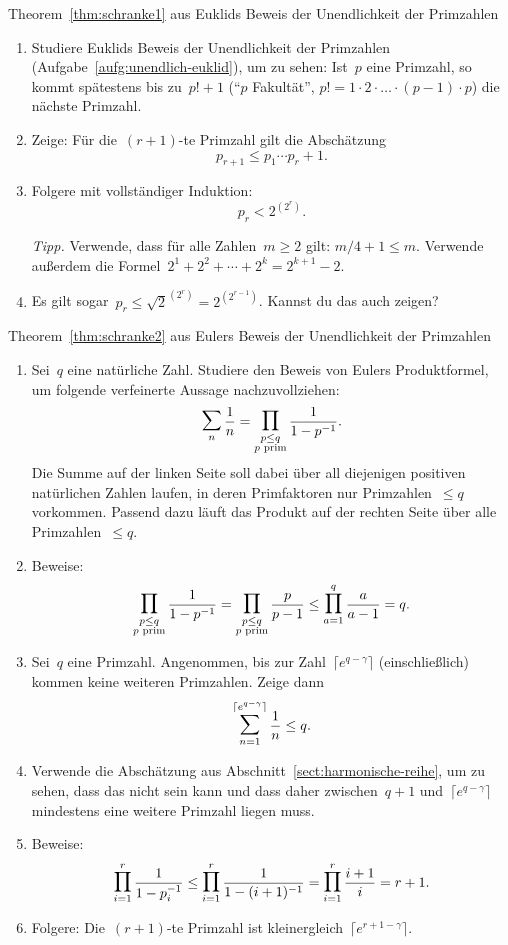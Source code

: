\documentclass[twoside]{../zirkelblatt1415}
\theoremstyle{definition}
\theoremstyle{plain}
\theoremstyle{remark}
\newcommand{\prim}[1]{\text{\textnormal{$#1$ prim}}}
\newcommand{\bigsum}{\mathop{\mathlarger{\mathlarger{\sum}}}}
\newcommand{\bigprod}{\mathop{\mathlarger{\mathlarger{\prod}}}}
\begin{document}
\begin{aufgabe}{Theorem~\ref{thm:schranke1} aus Euklids Beweis der
Unendlichkeit der Primzahlen}
\begin{enumerate}
\item Studiere Euklids Beweis der Unendlichkeit der Primzahlen
(Aufgabe~\ref{aufg:unendlich-euklid}), um zu sehen: Ist~$p$ eine Primzahl, so
kommt spätestens bis zu~$p! + 1$ ("`$p$ Fakultät"', $p! = 1 \cdot 2 \cdot
\ldots \cdot (p-1) \cdot p$) die nächste Primzahl.
\item Zeige: Für die~$(r+1)$-te Primzahl gilt die Abschätzung
\[ p_{r+1} \leq p_1 \cdots p_r + 1. \]
\item Folgere mit vollständiger Induktion:
\[ p_r < 2^{(2^r)}. \]

\emph{Tipp.} Verwende, dass für alle Zahlen~$m \geq 2$ gilt: $m/4 +
1 \leq m$. Verwende außerdem die Formel~$2^1 + 2^2 + \cdots + 2^k = 2^{k+1} -
2$.
\item Es gilt sogar~$p_r \leq \sqrt{2}^{(2^r)} = 2^{(2^{r-1})}$. Kannst du das
auch zeigen?
\end{enumerate}\fixlistspacing
\end{aufgabe}

\begin{aufgabe}{Theorem~\ref{thm:schranke2} aus Eulers Beweis der
Unendlichkeit der Primzahlen}
\begin{enumerate}
\item Sei~$q$ eine natürliche Zahl. Studiere den Beweis von Eulers
Produktformel, um folgende verfeinerte Aussage nachzuvollziehen:
\[ \bigsum_n \frac{1}{n} = \bigprod_{\substack{p \leq q \\ \prim{p}}} \frac{1}{1 -
p^{-1}}. \]
Die Summe auf der linken Seite soll dabei über all diejenigen positiven
natürlichen Zahlen laufen, in deren Primfaktoren nur Primzahlen~$\leq q$
vorkommen. Passend dazu läuft das Produkt auf der rechten Seite über alle
Primzahlen~$\leq q$.
\item Beweise:
\[
  \bigprod_{\substack{p \leq q \\ \prim{p}}} \frac{1}{1 - p^{-1}} =
  \bigprod_{\substack{p \leq q \\ \prim{p}}} \frac{p}{p - 1} \leq
  \bigprod_{a=1}^q \frac{a}{a - 1} = q. \]
\item Sei~$q$ eine Primzahl. Angenommen, bis zur Zahl~$\lceil e^{q-\gamma}
\rceil$ (einschließlich) kommen keine weiteren Primzahlen. Zeige dann
\[ \bigsum_{n=1}^{\lceil e^{q-\gamma} \rceil} \frac{1}{n} \leq q. \]
\item Verwende die Abschätzung aus Abschnitt~\ref{sect:harmonische-reihe}, um
zu sehen, dass das nicht sein kann und dass daher zwischen~$q+1$ und~$\lceil
e^{q-\gamma} \rceil$ mindestens eine weitere Primzahl liegen muss.
\item Beweise:
\[
  \bigprod_{i=1}^r \frac{1}{1 - p_i^{-1}} \leq
  \bigprod_{i=1}^r \frac{1}{1 - (i+1)^{-1}} =
  \bigprod_{i=1}^r \frac{i+1}{i} = r+1. \]
\item Folgere: Die~$(r+1)$-te Primzahl ist kleinergleich~$\lceil e^{r+1-\gamma} \rceil$.
\end{enumerate}\fixlistspacing
\end{aufgabe}
\end{document}
